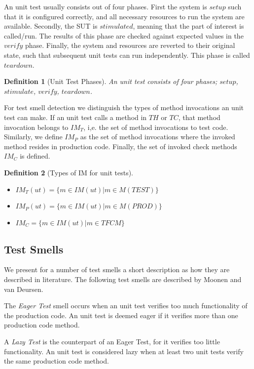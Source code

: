 \documentclass{uvamscse}
\newtheorem{definition}{Definition}[section]
\newcommand{\AtestSmell}{Moonen and van Deursen}
\begin{document}
An unit test usually consists out of four phases. First the system is $setup$ such that it is configured correctly, and all necessary resources to run the system are available. Secondly, the SUT is $stimulated$, meaning that the part of interest is called/run. The results of this phase are checked against expected values in the $verify$ phase. Finally, the system and resources are reverted to their original state, such that subsequent unit tests can run independently. This phase is called $teardown$.

\begin{definition}[Unit Test Phases] 
	\label{def:testPhases}
	An unit test consists of four phases; $setup$, $stimulate$, $verify$, $teardown$.
\end{definition}

For test smell detection we distinguish the types of method invocations an unit test can make. If an unit test calls a method in $TH$ or $TC$, that method invocation belongs to $IM_T$, i,e. the set of method invocations to test code. Similarly, we define $IM_P$ as the set of method invocations where the invoked method resides in production code. Finally, the set of invoked check methods $IM_C$ is defined.

\begin{definition}[Types of IM for unit tests] \hspace{1em}
	\begin{itemize}
		\item $IM_T(ut) = \{m \in IM(ut) | m \in M(TEST)\}$
		\item $IM_P(ut) = \{m \in IM(ut) | m \in M(PROD)\}$
		\item $IM_C = \{m \in IM(ut) | m \in TFCM\}$
	\end{itemize}
\end{definition}

\subsection{Test Smells}
We present for a number of test smells a short description as how they are described in literature. The following test smells are described by \AtestSmell \cite{van2001refactoring}.

The \emph{Eager Test} smell occurs when an unit test verifies too much functionality of the production code. An unit test is deemed eager if it verifies more than one production code method.

A \emph{Lazy Test} is the counterpart of an Eager Test, for it verifies too little functionality. An unit test is considered lazy when at least two unit tests verify the same production code method.
\end{document}
